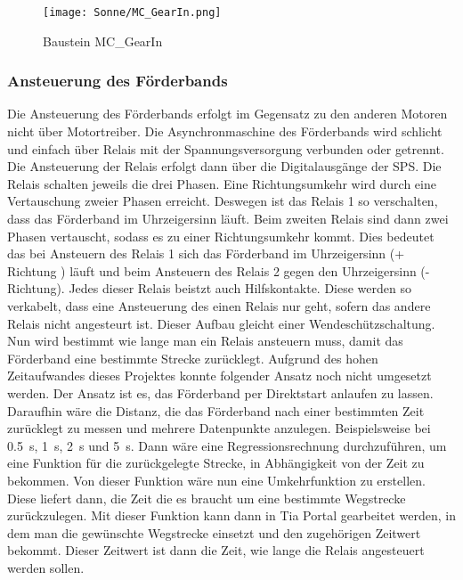 \begin{figure}[h]
    \centering
    \texttt{[image: Sonne/MC\_GearIn.png]}    
    \caption{Baustein MC\_GearIn}
    \label{MC_GearIn}
\end{figure}

\subsubsection{Ansteuerung des Förderbands}
\label{Ansteuerung des Förderbandes}
Die Ansteuerung des Förderbands erfolgt im Gegensatz zu den anderen Motoren nicht über Motortreiber. Die Asynchronmaschine des Förderbands wird schlicht und einfach über Relais mit der Spannungsversorgung verbunden oder getrennt. Die Ansteuerung der Relais erfolgt dann über die Digitalausgänge der SPS. Die Relais schalten jeweils die drei Phasen. Eine Richtungsumkehr wird durch eine Vertauschung zweier Phasen erreicht. Deswegen ist das Relais 1 so verschalten, dass das Förderband im Uhrzeigersinn läuft. Beim zweiten Relais sind dann zwei Phasen vertauscht, sodass es zu einer Richtungsumkehr kommt. Dies bedeutet das bei Ansteuern des Relais 1 sich das Förderband im Uhrzeigersinn (+ Richtung ) läuft und beim Ansteuern des  Relais 2 gegen den Uhrzeigersinn (- Richtung). Jedes dieser Relais beistzt auch Hilfskontakte. Diese werden so verkabelt, dass eine Ansteuerung des einen Relais nur geht, sofern das andere Relais nicht angesteurt ist. Dieser Aufbau gleicht einer Wendeschützschaltung. \\
Nun wird bestimmt wie lange man ein Relais ansteuern muss, damit das Förderband eine bestimmte Strecke zurücklegt. Aufgrund des hohen Zeitaufwandes dieses Projektes konnte folgender Ansatz noch nicht umgesetzt werden. Der Ansatz ist es, das Förderband per Direktstart anlaufen zu lassen. Daraufhin wäre die Distanz, die das Förderband nach einer bestimmten Zeit zurücklegt zu messen und mehrere Datenpunkte anzulegen. Beispielsweise bei \qty{0.5}{\second}, \qty{1}{\second}, \qty{2}{\second} und \qty{5}{\second}. Dann wäre eine Regressionsrechnung durchzuführen, um eine Funktion für die zurückgelegte Strecke, in Abhängigkeit von der Zeit zu bekommen. Von dieser Funktion wäre nun eine Umkehrfunktion zu erstellen. Diese liefert dann, die Zeit die es braucht um eine bestimmte Wegstrecke zurückzulegen. Mit dieser Funktion kann dann in Tia Portal gearbeitet werden, in dem man die gewünschte Wegstrecke einsetzt und den zugehörigen Zeitwert bekommt. Dieser Zeitwert ist dann die Zeit, wie lange die Relais angesteuert werden sollen. 

